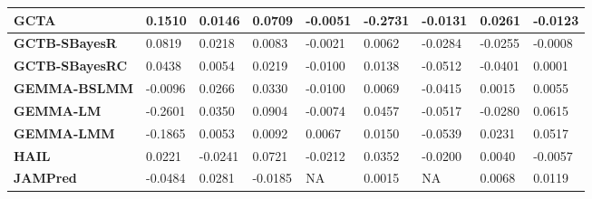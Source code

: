 \documentclass[pdflatex,sn-basic]{sn-jnl}
\begin{document}
\begin{table}[!ht]
{\begin{tabular}{|l|l|l|l|l|l|l|l|l|}
\hline
\textbf{GCTA} & \cellcolor[HTML]{C6DB81}0.1510 & \cellcolor[HTML]{FDC67D}0.0146 & \cellcolor[HTML]{B0D580}0.0709 & \cellcolor[HTML]{FEEB84}-0.0051 & \cellcolor[HTML]{F8696B}-0.2731 & \cellcolor[HTML]{E3E383}-0.0131 & \cellcolor[HTML]{DDE283}0.0261 & \cellcolor[HTML]{FA9874}-0.0123 \\
\hline
\textbf{GCTB-SBayesR} & \cellcolor[HTML]{FDEB84}0.0819 & \cellcolor[HTML]{FDD680}0.0218 & \cellcolor[HTML]{FCC37C}0.0083 & \cellcolor[HTML]{F3E884}-0.0021 & \cellcolor[HTML]{FFEB84}0.0062 & \cellcolor[HTML]{FEE282}-0.0284 & \cellcolor[HTML]{FBA476}-0.0255 & \cellcolor[HTML]{FEE482}-0.0008 \\
\hline
\textbf{GCTB-SBayesRC} & \cellcolor[HTML]{FEDD81}0.0438 & \cellcolor[HTML]{FBB179}0.0054 & \cellcolor[HTML]{FEDD81}0.0219 & \cellcolor[HTML]{FEDA80}-0.0100 & \cellcolor[HTML]{EEE784}0.0138 & \cellcolor[HTML]{FBB078}-0.0512 & \cellcolor[HTML]{F98570}-0.0401 & \cellcolor[HTML]{FEEA83}0.0001 \\
\hline
\textbf{GEMMA-BSLMM} & \cellcolor[HTML]{FDC97D}-0.0096 & \cellcolor[HTML]{FEE182}0.0266 & \cellcolor[HTML]{F8E984}0.0330 & \cellcolor[HTML]{FEDA80}-0.0100 & \cellcolor[HTML]{FEEB84}0.0069 & \cellcolor[HTML]{FCC57C}-0.0415 & \cellcolor[HTML]{FEDD81}0.0015 & \cellcolor[HTML]{F2E884}0.0055 \\
\hline
\textbf{GEMMA-LM} & \cellcolor[HTML]{F8696B}-0.2601 & \cellcolor[HTML]{E9E583}0.0350 & \cellcolor[HTML]{8BCA7E}0.0904 & \cellcolor[HTML]{FEE482}-0.0074 & \cellcolor[HTML]{A8D27F}0.0457 & \cellcolor[HTML]{FBAF78}-0.0517 & \cellcolor[HTML]{FA9F75}-0.0280 & \cellcolor[HTML]{63BE7B}0.0615 \\
\hline
\textbf{GEMMA-LMM} & \cellcolor[HTML]{F98570}-0.1865 & \cellcolor[HTML]{FBB178}0.0053 & \cellcolor[HTML]{FCC57C}0.0092 & \cellcolor[HTML]{D4DF82}0.0067 & \cellcolor[HTML]{ECE683}0.0150 & \cellcolor[HTML]{FBAA77}-0.0539 & \cellcolor[HTML]{E3E383}0.0231 & \cellcolor[HTML]{7CC67D}0.0517 \\
\hline
\textbf{HAIL} & \cellcolor[HTML]{FDD57F}0.0221 & \cellcolor[HTML]{F86F6C}-0.0241 & \cellcolor[HTML]{AED480}0.0721 & \cellcolor[HTML]{FBB178}-0.0212 & \cellcolor[HTML]{BFD981}0.0352 & \cellcolor[HTML]{F4E884}-0.0200 & \cellcolor[HTML]{FEE282}0.0040 & \cellcolor[HTML]{FCC47C}-0.0057 \\
\hline
\textbf{JAMPred} & \cellcolor[HTML]{FCBA7A}-0.0484 & \cellcolor[HTML]{FEE582}0.0281 & \cellcolor[HTML]{FA9072}-0.0185 & NA& \cellcolor[HTML]{FEE883}0.0015 & NA& \cellcolor[HTML]{FEE883}0.0068 & \cellcolor[HTML]{E2E383}0.0119 \\

\end{tabular}}
\end{table}
\end{document}
